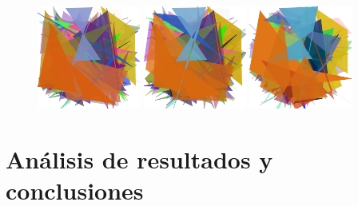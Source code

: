 \documentclass[11pt, spanish]{article}
\begin{document}
\begin{figure}[htp]
  \centering
  \includegraphics{media/paralell83.jpg}
  \includegraphics{media/paralell111.jpg}
  \includegraphics{media/paralell188.jpg}
\end{figure}

\section{Análisis de resultados y conclusiones}
\label{sec:conclusiones}





\end{document}
